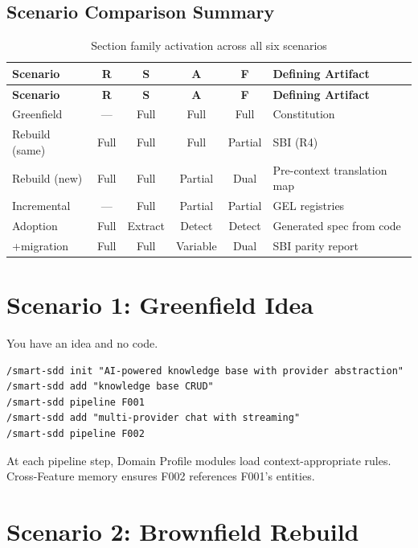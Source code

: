 \documentclass[11pt,a4paper,openright,twoside]{report}
\begin{document}
\subsection{Scenario Comparison Summary}

\begin{longtable}{lccccl}
\caption{Section family activation across all six scenarios} \\
\toprule
\textbf{Scenario} & \textbf{R} & \textbf{S} & \textbf{A} & \textbf{F} & \textbf{Defining Artifact} \\
\midrule
\endfirsthead
\toprule
\textbf{Scenario} & \textbf{R} & \textbf{S} & \textbf{A} & \textbf{F} & \textbf{Defining Artifact} \\
\midrule
\endhead
\bottomrule
\endfoot

Greenfield        & ---  & Full & Full & Full    & Constitution \\
Rebuild (same)    & Full & Full & Full & Partial & SBI (R4) \\
Rebuild (new)     & Full & Full & Partial & Dual & Pre-context translation map \\
Incremental       & ---  & Full & Partial & Partial & GEL registries \\
Adoption          & Full & Extract & Detect & Detect & Generated spec from code \\
+migration        & Full & Full & Variable & Dual & SBI parity report \\

\end{longtable}


\section{Scenario 1: Greenfield Idea}

You have an idea and no code.

\begin{lstlisting}
/smart-sdd init "AI-powered knowledge base with provider abstraction"
/smart-sdd add "knowledge base CRUD"
/smart-sdd pipeline F001
/smart-sdd add "multi-provider chat with streaming"
/smart-sdd pipeline F002
\end{lstlisting}

At each pipeline step, Domain Profile modules load context-appropriate rules. Cross-Feature memory ensures F002 references F001's entities.

\section{Scenario 2: Brownfield Rebuild}
\end{document}
